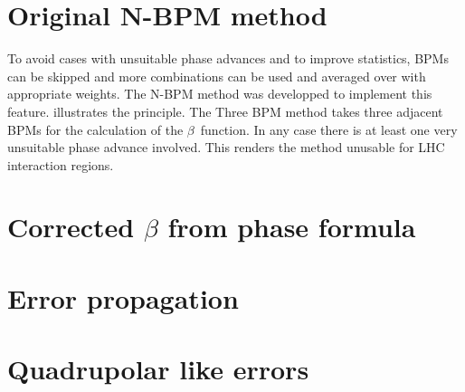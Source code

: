\section{Original N-BPM method}

To avoid cases with unsuitable phase advances and to improve statistics, BPMs can be skipped and more combinations
can be used and averaged over with appropriate weights.
The N-BPM method was developped \cite{AndyNBPM, AndyThesis} to implement this feature.
 illustrates the principle. The Three BPM method takes three adjacent BPMs
for the calculation of the $\beta$~function. In any case there is at least one very unsuitable phase
advance involved. This renders the method unusable for LHC interaction regions.

\section{Corrected $\beta$ from phase formula}

\section{Error propagation}

\section{Quadrupolar like errors}

